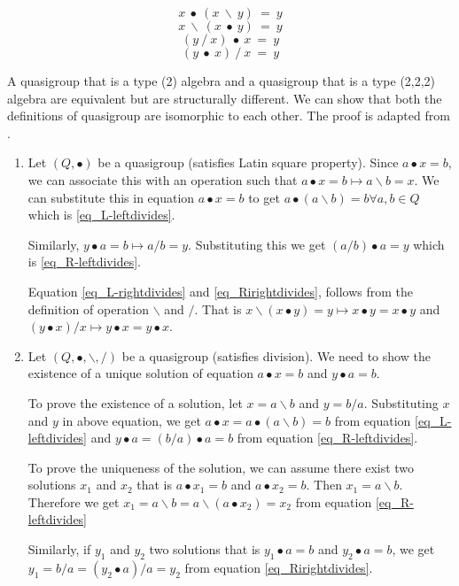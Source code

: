 \begin{equation} \label{eq_L-leftdivides}
  x\ ∙\ (x\ \backslash\ y) \ = \ y
\end{equation}
\begin{equation} \label{eq_L-rightdivides}
  x\ \backslash\ (x\ ∙\ y)\ = \ y
\end{equation}
\begin{equation} \label{eq_R-leftdivides}
  (y\ /\ x)\ ∙\ x \ =\ y
\end{equation}
\begin{equation} \label{eq_Rirightdivides}
  (y\ ∙\ x)\ /\ x \ =\ y
\end{equation}

A quasigroup that is a type (2) algebra and a quasigroup that is a type (2,2,2)
algebra are equivalent but are structurally different. We can show that both the
definitions of quasigroup are isomorphic to each other. The proof is adapted
from \cite{shcherbacov2003elements}.

\begin{enumerate}
  \item 
Let $(Q, ∙)$ be a quasigroup (satisfies Latin square property). Since $ a ∙ x =
b$, we can associate this with an operation such that $a ∙ x = b \mapsto a
\backslash b = x$. We can substitute this in equation $a ∙ x = b$ to get $a ∙ (a
\backslash b) = b \forall a,b \in Q$ which is \ref{eq_L-leftdivides}.

Similarly, $y ∙ a = b \mapsto a / b = y$. Substituting this we get $ (a / b) ∙ a
= y$ which is \ref{eq_R-leftdivides}.

Equation \ref{eq_L-rightdivides} and \ref{eq_Rirightdivides}, follows from the
definition of operation $\backslash$ and $/$. That is $x \backslash (x ∙ y) = y \mapsto x
∙ y = x ∙ y$ and $(y ∙ x) /x \mapsto y ∙ x = y ∙ x$.

\item 
Let $(Q,∙, \backslash, /)$ be a quasigroup (satisfies division). We need to show
the existence of a unique solution of equation $ a ∙ x = b$ and $y ∙ a = b$.

To prove the existence of a solution, let $x = a\backslash b$ and $y = b / a$.
Substituting $x$ and $y$ in above equation, we get $a ∙ x = a ∙ (a \backslash b)
= b$ from equation \ref{eq_L-leftdivides} and $ y ∙ a = (b / a) ∙ a = b$ from
equation \ref{eq_R-leftdivides}.

To prove the uniqueness of the solution, we can assume there exist two solutions
$x_1$ and $x_2$ that is $a ∙ x_1 = b$ and $a ∙ x_2 = b$. Then $x_1 = a
\backslash b$. Therefore we get $x_1 = a \backslash b = a \backslash (a ∙ x_2) =
x_2$ from equation \ref{eq_R-leftdivides}

Similarly, if $y_1$ and $y_2$ two solutions that is $y_1 ∙ a = b$ and $y_2 ∙ a = b$, we get 
$y_1 = b / a = (y_2 ∙ a) / a = y_2$ from equation \ref{eq_Rirightdivides}.

\end{enumerate}

